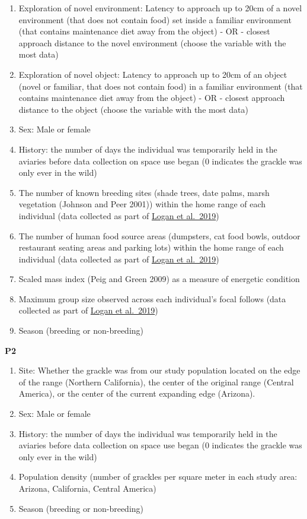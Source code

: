 \documentclass[
]{article}
\begin{document}
\begin{enumerate}
\def\labelenumi{\arabic{enumi})}
\item
  Exploration of novel environment: Latency to approach up to 20cm of a
  novel environment (that does not contain food) set inside a familiar
  environment (that contains maintenance diet away from the object) - OR
  - closest approach distance to the novel environment (choose the
  variable with the most data)
\item
  Exploration of novel object: Latency to approach up to 20cm of an
  object (novel or familiar, that does not contain food) in a familiar
  environment (that contains maintenance diet away from the object) - OR
  - closest approach distance to the object (choose the variable with
  the most data)
\item
  Sex: Male or female
\item
  History: the number of days the individual was temporarily held in the
  aviaries before data collection on space use began (0 indicates the
  grackle was only ever in the wild)
\item
  The number of known breeding sites (shade trees, date palms, marsh
  vegetation (Johnson and Peer 2001)) within the home range of each
  individual (data collected as part of
  \href{http://corinalogan.com/Preregistrations/g_flexforaging.html}{Logan
  et al.~2019})
\item
  The number of human food source areas (dumpsters, cat food bowls,
  outdoor restaurant seating areas and parking lots) within the home
  range of each individual (data collected as part of
  \href{http://corinalogan.com/Preregistrations/g_flexforaging.html}{Logan
  et al.~2019})
\item
  Scaled mass index (Peig and Green 2009) as a measure of energetic
  condition
\item
  Maximum group size observed across each individual's focal follows
  (data collected as part of
  \href{http://corinalogan.com/Preregistrations/g_flexforaging.html}{Logan
  et al.~2019})
\item
  Season (breeding or non-breeding)
\end{enumerate}

\textbf{P2}

\begin{enumerate}
\def\labelenumi{\arabic{enumi})}
\item
  Site: Whether the grackle was from our study population located on the
  edge of the range (Northern California), the center of the original
  range (Central America), or the center of the current expanding edge
  (Arizona).
\item
  Sex: Male or female
\item
  History: the number of days the individual was temporarily held in the
  aviaries before data collection on space use began (0 indicates the
  grackle was only ever in the wild)
\item
  Population density (number of grackles per square meter in each study
  area: Arizona, California, Central America)
\item
  Season (breeding or non-breeding)
\end{enumerate}
\end{document}
